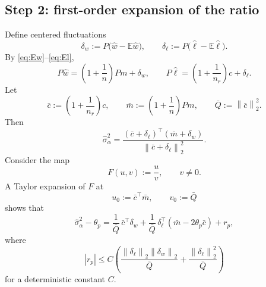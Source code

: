 \documentclass[11pt]{article}
\theoremstyle{definition}
\newcommand{\E}{\mathbb{E}}
\newcommand{\1}{\mathbf{1}}
\newcommand{\norm}[1]{\left\lVert #1 \right\rVert}
\newcommand{\abs}[1]{\left\lvert #1 \right\rvert}
\begin{document}
\subsection*{Step 2: first-order expansion of the ratio}

Define centered fluctuations
\[
 \delta_w:=P\bigl(\widehat w-\E\widehat w\bigr),
 \qquad
 \delta_\ell:=P\bigl(\widehat\ell-\E\widehat\ell\bigr).
\]
By \eqref{eq:Ew}--\eqref{eq:El},
\begin{equation}\label{eq:basic-decomp}
 P\widehat w=\left(1+\frac1n\right)Pm+\delta_w,
 \qquad
 P\widehat\ell=\left(1+\frac1{n_r}\right)c+\delta_\ell.
\end{equation}
Let
\[
 \bar c:=\left(1+\frac1{n_r}\right)c,
 \qquad
 \bar m:=\left(1+\frac1n\right)Pm,
 \qquad
 \bar Q:=\norm{\bar c}_2^2.
\]
Then
\[
 \widehat\sigma_\alpha^2=\frac{(\bar c+\delta_\ell)^\top(\bar m+\delta_w)}{\norm{\bar c+\delta_\ell}_2^2}.
\]
Consider the map
\[
 F(u,v):=\frac{u}{v},
 \qquad v\neq 0.
\]
A Taylor expansion of $F$ at
\[
 u_0:=\bar c^\top\bar m,
 \qquad
 v_0:=\bar Q
\]
shows that
\begin{equation}\label{eq:taylor-ratio}
 \widehat\sigma_\alpha^2-\theta_p
 =\frac1{\bar Q}\,\bar c^\top\delta_w
 +\frac1{\bar Q}\,\delta_\ell^\top(\bar m-2\theta_p\bar c)
 +r_p,
\end{equation}
where
\begin{equation}\label{eq:remainder-bound}
 \abs{r_p}
 \le C\left(\frac{\norm{\delta_\ell}_2\norm{\delta_w}_2}{\bar Q}
 +\frac{\norm{\delta_\ell}_2^2}{\bar Q}\right)
\end{equation}
for a deterministic constant $C$.
\end{document}
